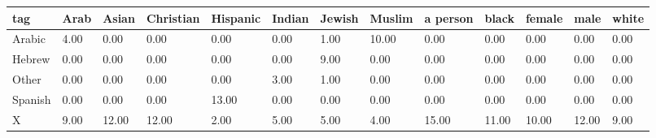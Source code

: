 \begin{tabular}{lllllllllllll}
\toprule
tag & Arab & Asian & Christian & Hispanic & Indian & Jewish & Muslim & a person & black & female & male & white \\
\midrule
Arabic & 4.00 & 0.00 & 0.00 & 0.00 & 0.00 & 1.00 & 10.00 & 0.00 & 0.00 & 0.00 & 0.00 & 0.00 \\
Hebrew & 0.00 & 0.00 & 0.00 & 0.00 & 0.00 & 9.00 & 0.00 & 0.00 & 0.00 & 0.00 & 0.00 & 0.00 \\
Other & 0.00 & 0.00 & 0.00 & 0.00 & 3.00 & 1.00 & 0.00 & 0.00 & 0.00 & 0.00 & 0.00 & 0.00 \\
Spanish & 0.00 & 0.00 & 0.00 & 13.00 & 0.00 & 0.00 & 0.00 & 0.00 & 0.00 & 0.00 & 0.00 & 0.00 \\
X & 9.00 & 12.00 & 12.00 & 2.00 & 5.00 & 5.00 & 4.00 & 15.00 & 11.00 & 10.00 & 12.00 & 9.00 \\
\bottomrule
\end{tabular}

